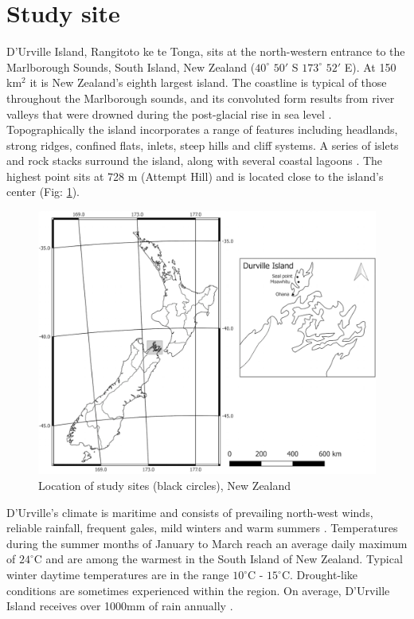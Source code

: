 \documentclass{article}
\begin{document}
\section{Study site}
D'Urville Island, Rangitoto ke te Tonga, sits at the north-western entrance to the Marlborough Sounds, South Island, New Zealand ($40^\circ$ $50'$ S $173^\circ$ $52'$ E).  At 150 km$^2$ it is New Zealand's eighth largest island.  The coastline is typical of those throughout the Marlborough sounds, and its convoluted form results from river valleys that were drowned during the post-glacial rise in sea level \citep{Wellman1962}.   Topographically the island incorporates a range of features including headlands, strong ridges, confined flats, inlets, steep hills and cliff systems.  A series of islets and rock stacks surround the island, along with several coastal lagoons \citep{Wellman1962}.  The highest point sits at 728 m (Attempt Hill) and is located close to the island's center (Fig: \ref{fig:durville}). 

\begin{figure}[H]
	\centering
	\includegraphics[scale=0.5]{figs/Durville.png}
	\caption[Location of study site (shaded)]{Location of study sites (black circles), New Zealand}
	\label{fig:durville}
\end{figure}

D'Urville's climate is maritime and consists of prevailing north-west winds, reliable rainfall, frequent gales, mild winters and warm summers \citep{walls}.  Temperatures during the summer months of January to March reach an average daily maximum of $24^{\circ}$C and are among the warmest in the South Island of New Zealand.  Typical winter daytime temperatures are in the range $10^{\circ}$C - $15^{\circ}$C.  Drought-like conditions are sometimes experienced within the region. On average, D'Urville Island receives over 1000mm of rain annually \citep{CliFlo}.
\end{document}
